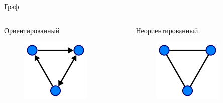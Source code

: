 \documentclass[10pt]{beamer}
\begin{document}
\begin{frame}{Граф}
\begin{columns}
	\begin{column}{.3\linewidth}
		Ориентированный
		\begin{figure}
		\centerline{\includegraphics[width=1.0\linewidth]{images/und_graph.png}}
		\end{figure}
	\end{column}
	\begin{column}{.3\linewidth}
		Неориентированный
		\begin{figure}
		\centerline{\includegraphics[width=1.0\linewidth]{images/d_graph.png}}
		\end{figure}
	\end{column}
\end{columns}
\end{frame}
\end{document}
